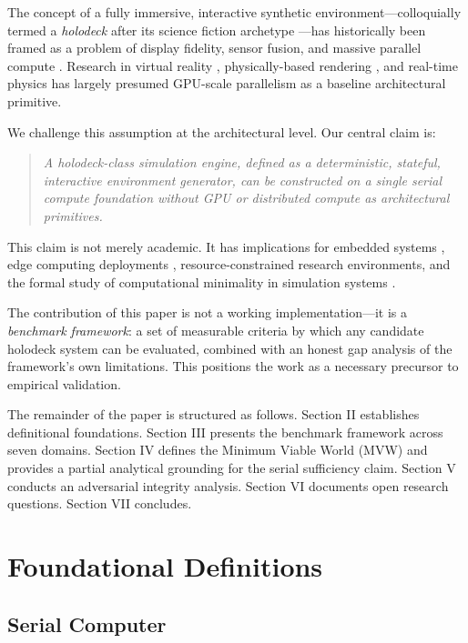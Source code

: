 \documentclass[conference]{IEEEtran}
\begin{document}
The concept of a fully immersive, interactive synthetic environment---colloquially
termed a \textit{holodeck} after its science fiction archetype \cite{okuda1994}---has
historically been framed as a problem of display fidelity, sensor fusion, and
massive parallel compute \cite{lanier2017, abrash2012}. Research in virtual reality
\cite{sutherland1968}, physically-based rendering \cite{pharr2023}, and real-time
physics \cite{ericson2004, catto2009} has largely presumed GPU-scale parallelism as
a baseline architectural primitive.

We challenge this assumption at the architectural level. Our central claim is:

\begin{quote}
\textit{A holodeck-class simulation engine, defined as a deterministic, stateful,
interactive environment generator, can be constructed on a single serial compute
foundation without GPU or distributed compute as architectural primitives.}
\end{quote}

This claim is not merely academic. It has implications for embedded systems
\cite{barr1999}, edge computing deployments \cite{shi2016edge}, resource-constrained
research environments, and the formal study of computational minimality in simulation
systems \cite{wolfram2002}.

The contribution of this paper is not a working implementation---it is a
\textit{benchmark framework}: a set of measurable criteria by which any candidate
holodeck system can be evaluated, combined with an honest gap analysis of the
framework's own limitations. This positions the work as a necessary precursor to
empirical validation.

The remainder of the paper is structured as follows. Section II establishes
definitional foundations. Section III presents the benchmark framework across seven
domains. Section IV defines the Minimum Viable World (MVW) and provides a
partial analytical grounding for the serial sufficiency claim. Section V conducts
an adversarial integrity analysis. Section VI documents open research questions.
Section VII concludes.

\section{Foundational Definitions}

\subsection{Serial Computer}
\end{document}
